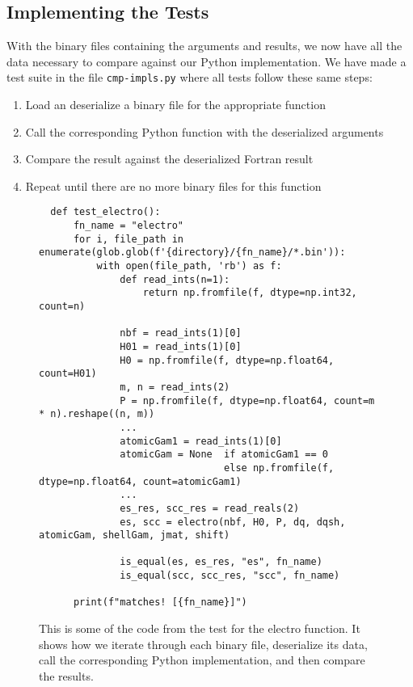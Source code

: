 \subsection{Implementing the Tests}

With the binary files containing the arguments and results, we now have all the data necessary to compare against our Python implementation. We have made a test suite in the file \verb|cmp-impls.py| where all tests follow these same steps:

\begin{enumerate}
   \item Load an deserialize a binary file for the appropriate function
   \item Call the corresponding Python function with the deserialized arguments
   \item Compare the result against the deserialized Fortran result
   \item Repeat until there are no more binary files for this function
\end{enumerate}


\begin{figure}[H]
\begin{verbatim}
  def test_electro():
      fn_name = "electro"
      for i, file_path in enumerate(glob.glob(f'{directory}/{fn_name}/*.bin')):
          with open(file_path, 'rb') as f:
              def read_ints(n=1):
                  return np.fromfile(f, dtype=np.int32, count=n)

              nbf = read_ints(1)[0]
              H01 = read_ints(1)[0]
              H0 = np.fromfile(f, dtype=np.float64, count=H01)
              m, n = read_ints(2)
              P = np.fromfile(f, dtype=np.float64, count=m * n).reshape((n, m))
              ...
              atomicGam1 = read_ints(1)[0]
              atomicGam = None  if atomicGam1 == 0
                                else np.fromfile(f, dtype=np.float64, count=atomicGam1)
              ...
              es_res, scc_res = read_reals(2)
              es, scc = electro(nbf, H0, P, dq, dqsh, atomicGam, shellGam, jmat, shift)

              is_equal(es, es_res, "es", fn_name)
              is_equal(scc, scc_res, "scc", fn_name)

      print(f"matches! [{fn_name}]")
\end{verbatim}
\caption{This is some of the code from the test for the electro function. It shows how we iterate through each binary file, deserialize its data, call the corresponding Python implementation, and then compare the results.}
\label{fig:testcode}
\end{figure}
